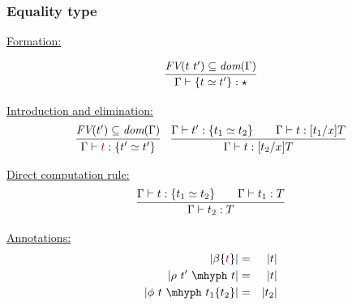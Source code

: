 \documentclass[11pt]{beamer}
\begin{document}
\begin{frame}
  \frametitle{Equality type}

  \underline{Formation:}

  \[
  \infer{\Gamma \vdash \{ t \simeq t' \} : \star}{\textit{FV}(t\ t')\subseteq\textit{dom}(\Gamma)}
  \]

  \underline{Introduction and elimination:}
  \[
  \begin{array}{ll}
    \infer{\Gamma\vdash \textcolor{purple}{t} : \{ t' \simeq t'\}}{\textit{FV}(t')\subseteq\textit{dom}(\Gamma)}
    &
    \infer{\Gamma\vdash t : [t_2/x]T}{\Gamma\vdash t' : \{ t_1\simeq t_2\} \qquad \Gamma\vdash t : [t_1/x]T}
  \end{array}
  \]

\vspace{.1cm}

  \underline{Direct computation rule:}
  \[
  \infer{\Gamma\vdash t_2 : T}{\Gamma\vdash t : \{ t_1 \simeq t_2\} \qquad \Gamma\vdash t_1 : T}
  \]

  \underline{Annotations:}
  \begin{eqnarray*}
    |\beta\{\textcolor{purple}{t}\}| & = & |t| \\
    |\rho\ t'\ \mhyph\ t| & = & |t| \\
    |\phi\ t\ \mhyph\ t_1\{t_2\}| & = & |t_2|
  \end{eqnarray*}


\vspace{-4.5cm}


\hspace{2.2cm}  

\vspace{4.5cm}
\end{frame}  
\end{document}

